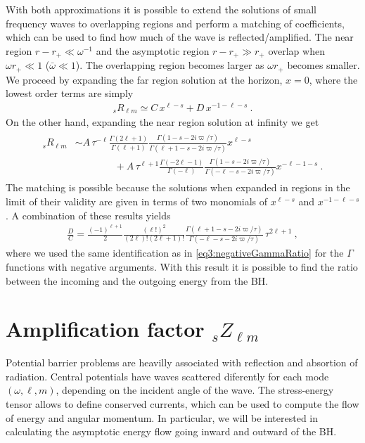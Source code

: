With both approximations it is possible to extend the solutions of small frequency waves to overlapping regions and perform a matching of coefficients, which can be used to find how much of the wave is reflected/amplified.
The near region $r-r_{+}\ll \omega^{-1}$ and the asymptotic region $r-r_{+}\gg r_{+}$ overlap when $\omega r_{+} \ll 1$ ($\bar{\omega}\ll 1$). The overlapping region becomes larger as $\omega r_{+}$ becomes smaller.
We proceed by expanding the far region solution  at the horizon, $x=0$, where the lowest order terms are simply
\begin{align}
    {}_{s}R_{\ell m} \simeq C \, x^{\ell-s} + D \, x^{-1-\ell-s} ~.
\end{align}
On the other hand, expanding the near region solution  at infinity we get
\begin{align}
    \begin{split}
        {}_{s}R_{\ell m} &\sim A \, \tau^{-\ell} \frac{ \Gamma(2\ell+1)}{\Gamma(\ell+1)} \frac{\Gamma(1-s - 2 i \varpi/\tau)}{\Gamma(\ell+1 - s - 2 i \varpi/\tau)} x^{\ell-s} \\
        &\qquad\qquad + A \, \tau^{\ell+1} \frac{\Gamma(-2\ell-1)}{\Gamma(-\ell)} \frac{\Gamma(1 - s - 2 i \varpi/\tau)}{ \Gamma(-\ell - s - 2 i \varpi/\tau)} x^{-\ell-1-s} ~.
    \end{split}
\end{align}
The matching is possible because the solutions when expanded in regions in the limit of their validity are given in terms of two monomials of $x^{\ell-s}$ and $x^{-1-\ell-s}$.
A combination of these results yields
\begin{align}
    \frac{D}{C} = \frac{(-1)^{\ell+1}}{2} \frac{(\ell !)^2}{(2\ell)! (2\ell+1)!} \frac{\Gamma(\ell+1 - s - 2 i \varpi/\tau)}{\Gamma(-\ell - s - 2 i \varpi/\tau)} \, \tau^{2\ell+1} ~,
\end{align}
where we used the same identification as in \eqref{eq3:negativeGammaRatio} for the $\Gamma$ functions with negative arguments.
With this result it is possible to find the ratio between the incoming and the outgoing energy from the BH.

\section{Amplification factor ${}_{s}Z_{\ell m}$}

Potential barrier problems are heavilly associated with reflection and absortion of radiation. 
Central potentials have waves scattered diferently for each mode $(\omega, \ell, m)$, depending on the incident angle of the wave.
The stress-energy tensor allows to define conserved currents, which can be used to compute the flow of energy and angular momentum.
In particular, we will be interested in calculating the asymptotic energy flow going inward and outward of the BH.

